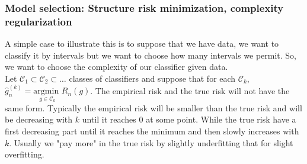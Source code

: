 \documentclass[11pt, english]{article}
\begin{document}
\subsubsection{Model selection: Structure risk minimization, complexity regularization}
A simple case to illustrate this is to suppose that we have data, we want to classify it by intervals but we want to choose how many intervals we permit. So, we want to choose the complexity of our classifier given data. \\

Let $\mathcal{C}_1\subset \mathcal{C}_2\subset\dots$ classes of classifiers and suppose that for each $\mathcal{C}_k$, $\hat{g}_n^{(k)}=\underset{g\in\mathcal{C}_k}{\text{argmin }}R_n(g)$. The empirical risk and the true risk will not have the same form. Typically the empirical risk will be smaller than the true risk and will be decreasing with $k$ until it reaches 0 at some point. While the true risk have a first decreasing part until it reaches the minimum and then slowly increases with $k$. Usually we "pay more" in the true risk by slightly underfitting that for slight overfitting.\\
\end{document}
